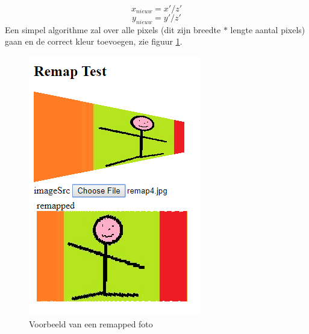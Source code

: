 $$x_{nieuw} = x'/z'$$  
$$y_{nieuw} = y'/z'$$
Een simpel algorithme zal over alle pixels (dit zijn breedte $ * $ lengte aantal pixels) gaan en de correct kleur toevoegen, zie figuur \ref{mappedfoto}. \cite{map}
\begin{figure}
\center
\includegraphics[scale=1]{remapEx}
\caption{Voorbeeld van een remapped foto}
\label{mappedfoto}
\end{figure}




